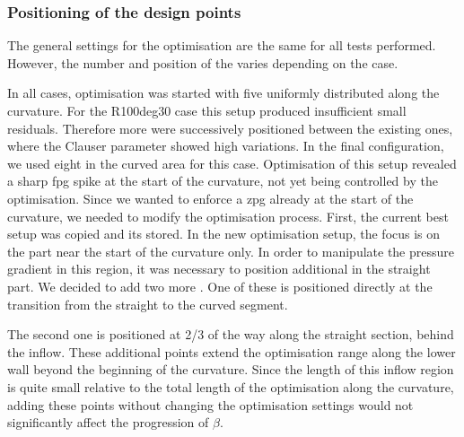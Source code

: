 \subsubsection{Positioning of the design points}
The general settings for the optimisation are the same for all tests performed.
However, the number and position of the  varies depending on the case.


In all cases, optimisation was started with five  uniformly distributed along the curvature. 
For the R100deg30 case this setup produced insufficient small residuals. 
Therefore  more  were successively positioned  between the existing ones,  where the Clauser parameter showed high variations.
In the final configuration, we used eight  in the curved area for this case.
Optimisation of this setup revealed a sharp \acrshort{fpg} spike at the start of the curvature, not yet being controlled by the optimisation.
Since we wanted to enforce a \acrshort{zpg} already at the start of the curvature, we needed to modify the optimisation process.
First, the current best setup was copied and its  stored. 
In the new optimisation setup, the focus is on the part near the start of the curvature only.
In order to manipulate the pressure gradient in this region, it was necessary to position additional  in the straight part. 
We decided to add two more .
One of these is positioned directly at the transition from the straight to the curved segment.

The second one is positioned at 2/3 of the way along the straight section, behind the inflow. 
These additional points extend the optimisation range along the lower wall beyond the beginning of the curvature. 
Since the length of this inflow region is quite small relative to the total  length of the optimisation  along the curvature, adding these points without changing the optimisation settings would not significantly affect the progression of $\beta$.

